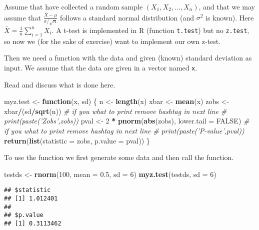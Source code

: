 \documentclass[]{article}
\newenvironment{Shaded}{\begin{snugshade}}{\end{snugshade}}
\newcommand{\KeywordTok}[1]{\textcolor[rgb]{0.13,0.29,0.53}{\textbf{#1}}}
\newcommand{\DataTypeTok}[1]{\textcolor[rgb]{0.13,0.29,0.53}{#1}}
\newcommand{\DecValTok}[1]{\textcolor[rgb]{0.00,0.00,0.81}{#1}}
\newcommand{\FloatTok}[1]{\textcolor[rgb]{0.00,0.00,0.81}{#1}}
\newcommand{\StringTok}[1]{\textcolor[rgb]{0.31,0.60,0.02}{#1}}
\newcommand{\CommentTok}[1]{\textcolor[rgb]{0.56,0.35,0.01}{\textit{#1}}}
\newcommand{\OtherTok}[1]{\textcolor[rgb]{0.56,0.35,0.01}{#1}}
\newcommand{\ControlFlowTok}[1]{\textcolor[rgb]{0.13,0.29,0.53}{\textbf{#1}}}
\newcommand{\OperatorTok}[1]{\textcolor[rgb]{0.81,0.36,0.00}{\textbf{#1}}}
\newcommand{\NormalTok}[1]{#1}
\begin{document}
Assume that have collected a random sample \((X_1,X_2,\ldots,X_n)\), and
that we may assume that \(\frac{\bar{X}-\mu}{\sigma/\sqrt{n}}\) follows
a standard normal distribution (and \(\sigma^2\) is known). Here
\(\bar{X}=\frac{1}{n} \sum_{i=1}^n X_i\). A t-test is implemented in R
(function \texttt{t.test}) but no \texttt{z.test}, so now we (for the
sake of exercise) want to implement our own z-test.

Then we need a function with the data and given (known) standard
deviation as input. We assume that the data are given in a vector named
\texttt{x}.

Read and discuss what is done here.

\begin{Shaded}
\begin{Highlighting}[]
\NormalTok{myz.test <-}\StringTok{ }\ControlFlowTok{function}\NormalTok{(x, sd) \{}
\NormalTok{    n <-}\StringTok{ }\KeywordTok{length}\NormalTok{(x)}
\NormalTok{    xbar <-}\StringTok{ }\KeywordTok{mean}\NormalTok{(x)}
\NormalTok{    zobs <-}\StringTok{ }\NormalTok{xbar}\OperatorTok{/}\NormalTok{(sd}\OperatorTok{/}\KeywordTok{sqrt}\NormalTok{(n))}
    \CommentTok{# if you what to print remove hashtag in next line}
    \CommentTok{# print(paste('Zobs',zobs))}
\NormalTok{    pval <-}\StringTok{ }\DecValTok{2} \OperatorTok{*}\StringTok{ }\KeywordTok{pnorm}\NormalTok{(}\KeywordTok{abs}\NormalTok{(zobs), }\DataTypeTok{lower.tail =} \OtherTok{FALSE}\NormalTok{)}
    \CommentTok{# if you what to print remove hashtag in next line}
    \CommentTok{# print(paste('P-value',pval))}
    \KeywordTok{return}\NormalTok{(}\KeywordTok{list}\NormalTok{(}\DataTypeTok{statistic =}\NormalTok{ zobs, }\DataTypeTok{p.value =}\NormalTok{ pval))}
\NormalTok{\}}
\end{Highlighting}
\end{Shaded}

To use the function we first generate some data and then call the
function.

\begin{Shaded}
\begin{Highlighting}[]
\NormalTok{testds <-}\StringTok{ }\KeywordTok{rnorm}\NormalTok{(}\DecValTok{100}\NormalTok{, }\DataTypeTok{mean =} \FloatTok{0.5}\NormalTok{, }\DataTypeTok{sd =} \DecValTok{6}\NormalTok{)}
\KeywordTok{myz.test}\NormalTok{(testds, }\DataTypeTok{sd =} \DecValTok{6}\NormalTok{)}
\end{Highlighting}
\end{Shaded}

\begin{verbatim}
## $statistic
## [1] 1.012401
## 
## $p.value
## [1] 0.3113462
\end{verbatim}
\end{document}
